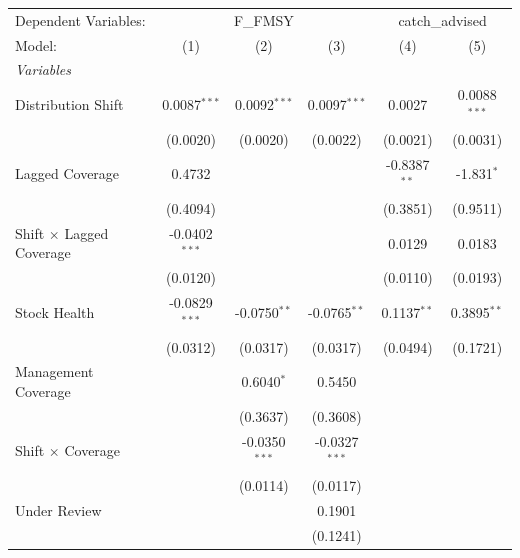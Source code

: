 
\begingroup
\centering
\begin{tabular}{lccccc}
   \tabularnewline \midrule \midrule
   Dependent Variables: & \multicolumn{3}{c}{F\_FMSY} & \multicolumn{2}{c}{catch\_advised}\\
   Model:                          & (1)             & (2)             & (3)             & (4)            & (5)\\  
   \midrule
   \emph{Variables}\\
   Distribution Shift              & 0.0087$^{***}$  & 0.0092$^{***}$  & 0.0097$^{***}$  & 0.0027         & 0.0088$^{***}$\\   
                                   & (0.0020)        & (0.0020)        & (0.0022)        & (0.0021)       & (0.0031)\\   
   Lagged Coverage                 & 0.4732          &                 &                 & -0.8387$^{**}$ & -1.831$^{*}$\\   
                                   & (0.4094)        &                 &                 & (0.3851)       & (0.9511)\\   
   Shift $\times$ Lagged Coverage  & -0.0402$^{***}$ &                 &                 & 0.0129         & 0.0183\\   
                                   & (0.0120)        &                 &                 & (0.0110)       & (0.0193)\\   
   Stock Health                    & -0.0829$^{***}$ & -0.0750$^{**}$  & -0.0765$^{**}$  & 0.1137$^{**}$  & 0.3895$^{**}$\\   
                                   & (0.0312)        & (0.0317)        & (0.0317)        & (0.0494)       & (0.1721)\\   
   Management Coverage             &                 & 0.6040$^{*}$    & 0.5450          &                &   \\   
                                   &                 & (0.3637)        & (0.3608)        &                &   \\   
   Shift $\times$ Coverage         &                 & -0.0350$^{***}$ & -0.0327$^{***}$ &                &   \\   
                                   &                 & (0.0114)        & (0.0117)        &                &   \\   
   Under Review                    &                 &                 & 0.1901          &                &   \\   
                                   &                 &                 & (0.1241)        &                &   \\   

\end{tabular}
